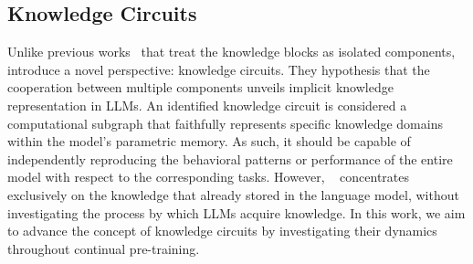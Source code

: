 \subsection{Knowledge Circuits}
Unlike previous works~\citep{knowledge_neurons,ffn_kv,llm_factual_recall,rome} that treat the knowledge blocks as isolated components, ~\citet{knowledge_circuits} introduce a novel perspective: knowledge circuits.
They hypothesis that the cooperation between multiple components unveils implicit knowledge representation in LLMs.
An identified knowledge circuit is considered a computational subgraph that faithfully represents specific knowledge domains within the model's parametric memory.
As such, it should be capable of independently reproducing the behavioral patterns or performance of the entire model with respect to the corresponding tasks.
However, ~\citet{knowledge_circuits} concentrates exclusively on the knowledge that already stored in the language model, without investigating the process by which LLMs acquire knowledge.
In this work, we aim to advance the concept of knowledge circuits by investigating their dynamics throughout continual pre-training. 